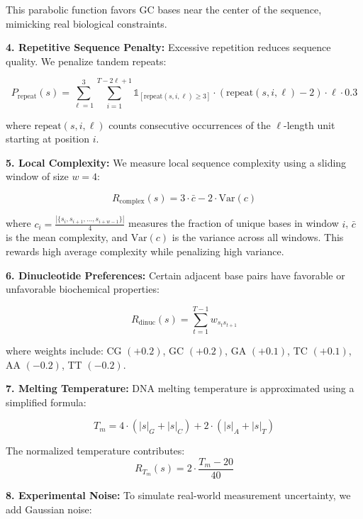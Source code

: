 \documentclass[conference]{IEEEtran}
\begin{document}
This parabolic function favors GC bases near the center of the sequence, mimicking real biological constraints.

\textbf{4. Repetitive Sequence Penalty:} Excessive repetition reduces sequence quality. We penalize tandem repeats:

\begin{equation}
P_{\text{repeat}}(s) = \sum_{\ell=1}^{3} \sum_{i=1}^{T-2\ell+1} \mathbb{1}_{[\text{repeat}(s, i, \ell) \geq 3]} \cdot (\text{repeat}(s, i, \ell) - 2) \cdot \ell \cdot 0.3
\end{equation}

where $\text{repeat}(s, i, \ell)$ counts consecutive occurrences of the $\ell$-length unit starting at position $i$.

\textbf{5. Local Complexity:} We measure local sequence complexity using a sliding window of size $w = 4$:

\begin{equation}
R_{\text{complex}}(s) = 3 \cdot \bar{c} - 2 \cdot \text{Var}(c)
\end{equation}

where $c_i = \frac{|\{s_i, s_{i+1}, \ldots, s_{i+w-1}\}|}{4}$ measures the fraction of unique bases in window $i$, $\bar{c}$ is the mean complexity, and $\text{Var}(c)$ is the variance across all windows. This rewards high average complexity while penalizing high variance.

\textbf{6. Dinucleotide Preferences:} Certain adjacent base pairs have favorable or unfavorable biochemical properties:

\begin{equation}
R_{\text{dinuc}}(s) = \sum_{t=1}^{T-1} w_{s_t s_{t+1}}
\end{equation}

where weights include: CG $(+0.2)$, GC $(+0.2)$, GA $(+0.1)$, TC $(+0.1)$, AA $(-0.2)$, TT $(-0.2)$.

\textbf{7. Melting Temperature:} DNA melting temperature is approximated using a simplified formula:

\begin{equation}
T_m = 4 \cdot (|s|_G + |s|_C) + 2 \cdot (|s|_A + |s|_T)
\end{equation}

The normalized temperature contributes:
\begin{equation}
R_{T_m}(s) = 2 \cdot \frac{T_m - 20}{40}
\end{equation}

\textbf{8. Experimental Noise:} To simulate real-world measurement uncertainty, we add Gaussian noise:
\end{document}

